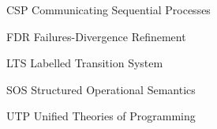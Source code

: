 \documentclass[
	12pt,				%
	a4paper,			%
	oneside,
	english			%
	]{abntex2}
\theoremstyle{definition}
\begin{document}
\listoffigures*
\cleardoublepage

\listoftables*
\cleardoublepage

\begin{siglas}
	\item[CSP] Communicating Sequential Processes
	\item[FDR] Failures-Divergence Refinement
	\item[LTS] Labelled Transition System
	\item[SOS] Structured Operational Semantics
	\item[UTP] Unified Theories of Programming
\end{siglas}

\tableofcontents*
\cleardoublepage


\textual









\postextual


\end{document}
